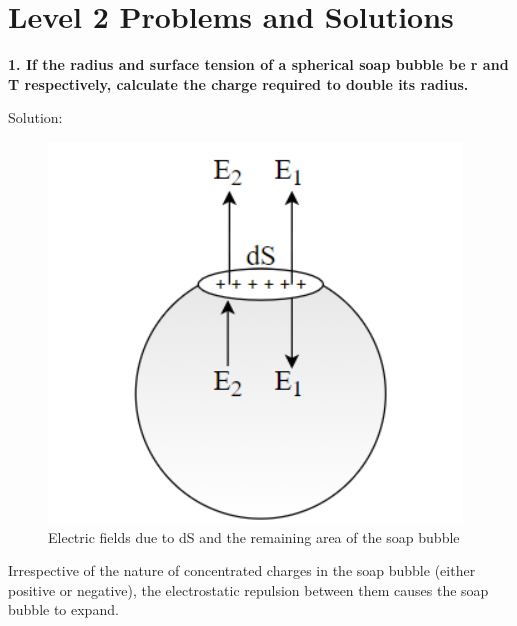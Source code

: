 \newpage
\section{Level 2 Problems and Solutions}
\begin{tcolorbox}
\textbf{1. If the radius and surface tension of a spherical soap bubble be r and T respectively, calculate the charge required to double its radius.} 
\end{tcolorbox}
 Solution:
\begin{figure}[h]
    \centering
    \includegraphics[scale = 0.5]{figures/elecmag/fig1.png}
    \caption{
 Electric fields due to dS and the remaining area of the soap bubble }
    \label{fig1}
\end{figure}

 Irrespective of the nature of concentrated charges in the soap bubble (either positive or negative), the electrostatic repulsion between them causes the soap bubble to expand.\\

